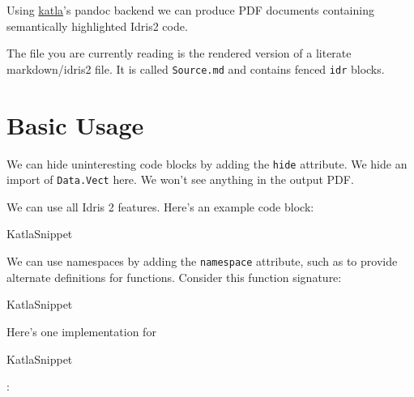 Using \href{https://github.com/idris-community/katla}{katla}'s pandoc
backend we can produce PDF documents containing semantically highlighted
Idris2 code.

The file you are currently reading is the rendered version of a literate
markdown/idris2 file. It is called \texttt{Source.md} and contains
fenced \texttt{idr} blocks.

\hypertarget{basic-usage}{%
\section{Basic Usage}\label{basic-usage}}

We can hide uninteresting code blocks by adding the \texttt{hide}
attribute. We hide an import of \texttt{Data.Vect} here. We won't see
anything in the output PDF.

We can use all Idris 2 features. Here's an example code block:

\let\KatlaSnippet\relax{}\newcommand\KatlaSnippet[1][]{\BUseVerbatim[#1]{KatlaSnippet}}
\begin{SaveVerbatim}[commandchars=\\\{\}]{KatlaSnippet}
\KatlaSpace{}\IdrisKeyword{:}\KatlaSpace{}\KatlaNewline{}
\KatlaSpace{}\IdrisKeyword{=}\KatlaSpace{}\KatlaSpace{}\IdrisFunction{+}\KatlaSpace{}\KatlaNewline{}
\end{SaveVerbatim}
\KatlaSnippet{}

We can use namespaces by adding the \texttt{namespace} attribute, such
as to provide alternate definitions for functions. Consider this
function signature:

\let\KatlaSnippet\relax{}\newcommand\KatlaSnippet[1][]{\BUseVerbatim[#1]{KatlaSnippet}}
\begin{SaveVerbatim}[commandchars=\\\{\}]{KatlaSnippet}
\KatlaSpace{}\IdrisKeyword{:}\KatlaSpace{}\KatlaSpace{}\KatlaSpace{}\KatlaSpace{}\IdrisKeyword{\KatlaDash{}>}\KatlaSpace{}\KatlaSpace{}\IdrisKeyword{(}\KatlaSpace{}\IdrisFunction{+}\KatlaSpace{}\IdrisKeyword{)}\KatlaSpace{}\KatlaNewline{}
\end{SaveVerbatim}
\KatlaSnippet{}

Here's one implementation for
\let\KatlaSnippet\relax{}\newcommand\KatlaSnippet[1][]{\UseVerb[#1]{KatlaSnippet}}
\begin{SaveVerbatim}[commandchars=\\\{\}]{KatlaSnippet}
\KatlaNewline{}
\end{SaveVerbatim}
\KatlaSnippet{}:

